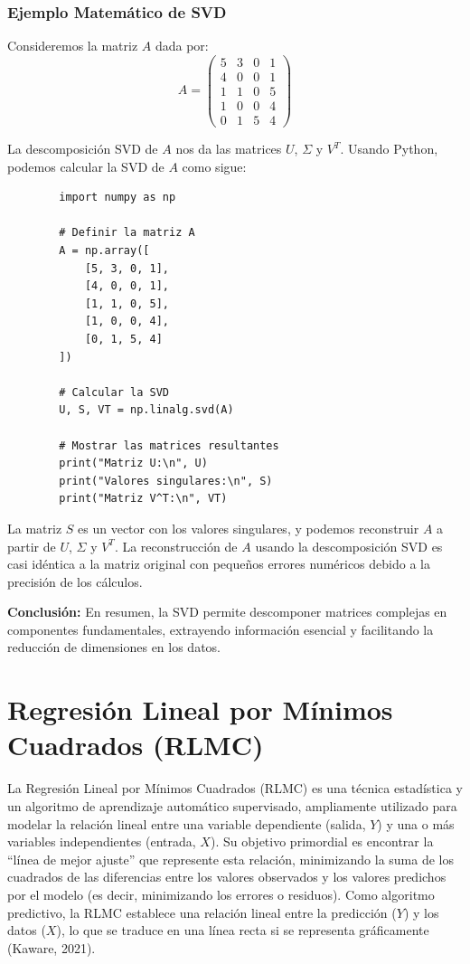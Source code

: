 \documentclass[12pt]{article}
\begin{document}
        \subsubsection*{Ejemplo Matemático de SVD}
        
        Consideremos la matriz $A$ dada por:
        \[
        A = \begin{pmatrix}
        5 & 3 & 0 & 1 \\
        4 & 0 & 0 & 1 \\
        1 & 1 & 0 & 5 \\
        1 & 0 & 0 & 4 \\
        0 & 1 & 5 & 4
        \end{pmatrix}
        \]
        
        La descomposición SVD de $A$ nos da las matrices $U$, $\Sigma$ y $V^T$. Usando Python, podemos calcular la SVD de $A$ como sigue:
        \begin{verbatim}
        import numpy as np
        
        # Definir la matriz A
        A = np.array([
            [5, 3, 0, 1],
            [4, 0, 0, 1],
            [1, 1, 0, 5],
            [1, 0, 0, 4],
            [0, 1, 5, 4]
        ])
        
        # Calcular la SVD
        U, S, VT = np.linalg.svd(A)
        
        # Mostrar las matrices resultantes
        print("Matriz U:\n", U)
        print("Valores singulares:\n", S)
        print("Matriz V^T:\n", VT)
        \end{verbatim}
        
        La matriz $S$ es un vector con los valores singulares, y podemos reconstruir $A$ a partir de $U$, $\Sigma$ y $V^T$. La reconstrucción de $A$ usando la descomposición SVD es casi idéntica a la matriz original con pequeños errores numéricos debido a la precisión de los cálculos.
        
        \noindent
        \textbf{Conclusión:} En resumen, la SVD permite descomponer matrices complejas en componentes fundamentales, extrayendo información esencial y facilitando la reducción de dimensiones en los datos.
        
        \section*{Regresión Lineal por Mínimos Cuadrados (RLMC)}
        \noindent
        La Regresión Lineal por Mínimos Cuadrados (RLMC) es una técnica estadística y un algoritmo de aprendizaje automático supervisado, ampliamente utilizado para modelar la relación lineal entre una variable dependiente (salida, $Y$) y una o más variables independientes (entrada, $X$). Su objetivo primordial es encontrar la “línea de mejor ajuste” que represente esta relación, minimizando la suma de los cuadrados de las diferencias entre los valores observados y los valores predichos por el modelo (es decir, minimizando los errores o residuos). Como algoritmo predictivo, la RLMC establece una relación lineal entre la predicción ($Y$) y los datos ($X$), lo que se traduce en una línea recta si se representa gráficamente (Kaware, 2021).
        
\end{document}
